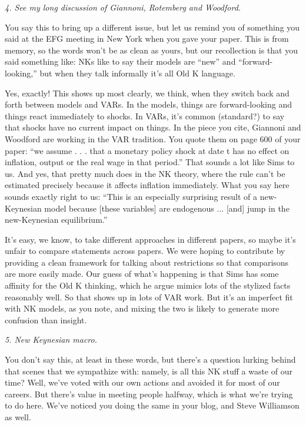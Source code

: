 \documentclass[12pt]{article}
\begin{document}
{\it 4. See my long discussion of Giannoni, Rotemberg and Woodford.\/}

You say this to bring up a different issue, but let us remind you of something you said
at the EFG meeting in New York when you gave your paper.
This is from memory, so the words won't be as clean as yours,
but our recollection is that you said something like:
NKs like to say their models are ``new'' and ``forward-looking,''
but when they talk informally it's all Old K language.

Yes, exactly!
This shows up most clearly, we think, when they switch back and forth between models
and VARs.
In the models, things are forward-looking and things react immediately to shocks.
In VARs, it's common (standard?) to say that shocks have no current impact on things.
In the piece you cite, Giannoni and Woodford are working in the VAR tradition.
You quote them on page 600 of your paper:
``we assume . . . that a monetary policy shock at date t has no effect on inflation, output or the real wage in that period.''
That sounds a lot like Sims to us.
And yes, that  pretty much does in the NK theory, where the rule can't be estimated
precisely because it affects inflation immediately.
What you say here sounds exactly right to us:
``This is an especially surprising result of a new-Keynesian model because
[these variables] are endogenous ... [and] jump in the new-Keynesian equilibrium.''

It's easy, we know, to take different approaches in different papers,
so maybe it's unfair to compare statements across papers.
We were hoping to contribute by providing a clean framework
for talking about restrictions
so that comparisons are more easily made.
Our guess of what's happening is that Sims has some affinity for the Old K thinking,
which he argue mimics lots of the stylized facts reasonably well.
So that shows up in lots of VAR work.
But it's an imperfect fit with NK models, as you note,
and mixing the two is likely to generate more confusion than insight.

{\it 5. New Keynesian macro.\/}

You don't say this, at least in these words,
but there's a question lurking behind that scenes that we sympathize with:
namely, is all this NK stuff a waste of our time?
Well, we've voted with our own actions and avoided it for most of our careers.
But there's value in meeting people halfway,
which is what we're trying to do here.
We've noticed you doing the same in your blog, and Steve Williamson as well.
\end{document}
